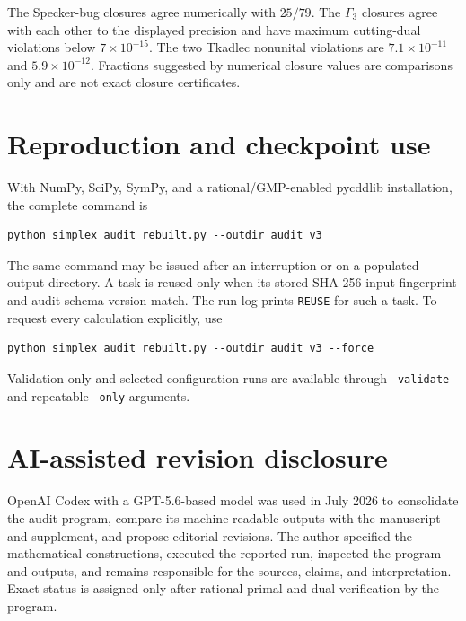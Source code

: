 \documentclass[11pt]{article}
\begin{document}
The Specker-bug closures agree numerically with $25/79$.  The $\Gamma_3$
closures agree with each other to the displayed precision and have maximum
cutting-dual violations below $7\times10^{-15}$.  The two Tkadlec nonunital
violations are $7.1\times10^{-11}$ and $5.9\times10^{-12}$.  Fractions suggested
by numerical closure values are comparisons only and are not exact closure
certificates.

\section{Reproduction and checkpoint use}

With NumPy, SciPy, SymPy, and a rational/GMP-enabled pycddlib installation,
the complete command is
\begin{verbatim}
python simplex_audit_rebuilt.py --outdir audit_v3
\end{verbatim}
The same command may be issued after an interruption or on a populated output
directory.  A task is reused only when its stored SHA-256 input fingerprint and
audit-schema version match.  The run log prints \texttt{REUSE} for such a task.
To request every calculation explicitly, use
\begin{verbatim}
python simplex_audit_rebuilt.py --outdir audit_v3 --force
\end{verbatim}
Validation-only and selected-configuration runs are available through
\texttt{--validate} and repeatable \texttt{--only} arguments.



\section{AI-assisted revision disclosure}

OpenAI Codex with a GPT-5.6-based model was used in July 2026 to consolidate the
audit program, compare its machine-readable outputs with the manuscript and
supplement, and propose editorial revisions.  The author specified the
mathematical constructions, executed the reported run, inspected the program
and outputs, and remains responsible for the sources, claims, and
interpretation.  Exact status is assigned only after rational primal and dual
verification by the program.
\end{document}
